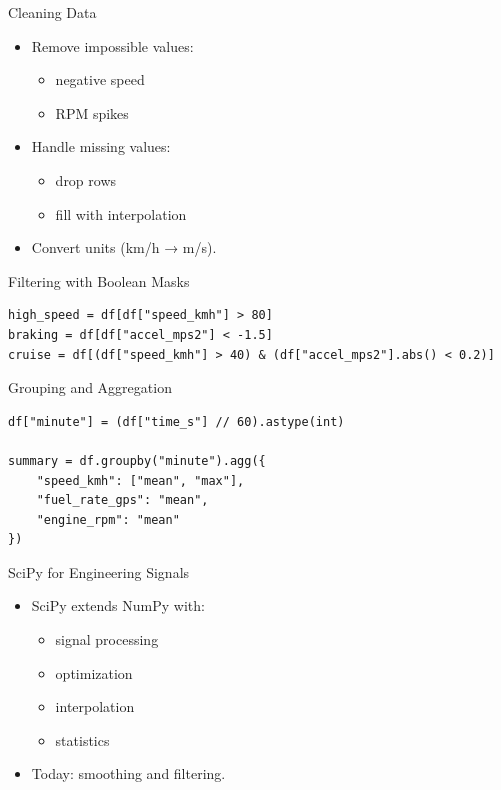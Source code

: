 \documentclass[aspectratio=169]{beamer}
\begin{document}
\begin{frame}{Cleaning Data}
  \begin{itemize}
    \item Remove impossible values:
      \begin{itemize}
        \item negative speed
        \item RPM spikes
      \end{itemize}
    \item Handle missing values:
      \begin{itemize}
        \item drop rows
        \item fill with interpolation
      \end{itemize}
    \item Convert units (km/h → m/s).
  \end{itemize}
\end{frame}

\begin{frame}[fragile]{Filtering with Boolean Masks}
\begin{verbatim}
high_speed = df[df["speed_kmh"] > 80]
braking = df[df["accel_mps2"] < -1.5]
cruise = df[(df["speed_kmh"] > 40) & (df["accel_mps2"].abs() < 0.2)]
\end{verbatim}
\end{frame}

\begin{frame}[fragile]{Grouping and Aggregation}
\begin{verbatim}
df["minute"] = (df["time_s"] // 60).astype(int)

summary = df.groupby("minute").agg({
    "speed_kmh": ["mean", "max"],
    "fuel_rate_gps": "mean",
    "engine_rpm": "mean"
})
\end{verbatim}
\end{frame}

\begin{frame}{SciPy for Engineering Signals}
  \begin{itemize}
    \item SciPy extends NumPy with:
      \begin{itemize}
        \item signal processing
        \item optimization
        \item interpolation
        \item statistics
      \end{itemize}
    \item Today: smoothing and filtering.
  \end{itemize}
\end{frame}
\end{document}
